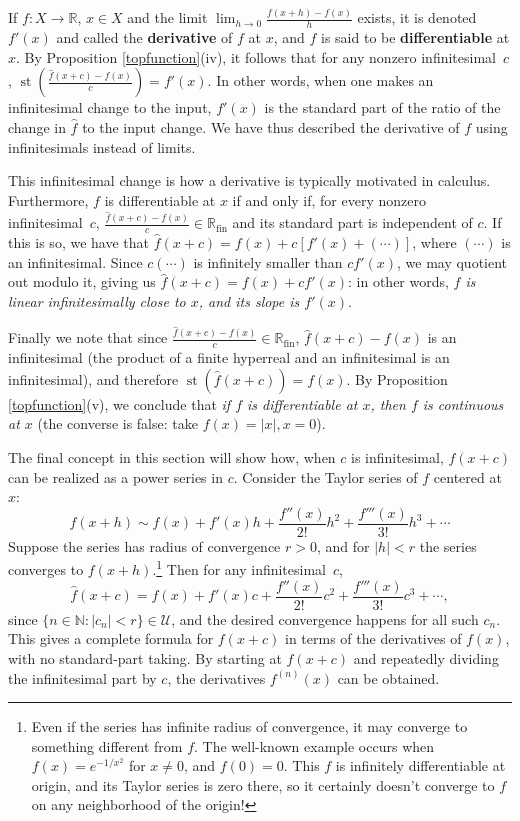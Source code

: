 \documentclass{article}
\def\U{\mathscr U}
\def\N{\mathbb N}
\def\R{\mathbb R}
\def\Rfin{\mathbb R_{\operatorname{fin}}}
\def\st{\operatorname{st}}
\begin{document}
If $f:X\to\R$, $x\in X$ and the limit $\lim_{h\to 0}\frac{f(x+h)-f(x)}h$ exists, it is denoted $f'(x)$ and called the \textbf{derivative} of $f$ at $x$, and $f$ is said to be \textbf{differentiable} at $x$.  By Proposition \ref{topfunction}(iv), it follows that for any nonzero infinitesimal~$c$, $\st\left(\frac{\widehat f(x+c)-f(x)}c\right)=f'(x)$.  In other words, when one makes an infinitesimal change to the input, $f'(x)$ is the standard part of the ratio of the change in $\widehat f$ to the input change.  We have thus described the derivative of $f$ using infinitesimals instead of limits.

This infinitesimal change is how a derivative is typically motivated in calculus.  Furthermore, $f$ is differentiable at $x$ if and only if, for every nonzero infinitesimal~$c$, $\frac{\widehat f(x+c)-f(x)}c\in\Rfin$ and its standard part is independent of $c$.  If this is so, we have that $\widehat f(x+c)=f(x)+c\left[f'(x)+(\cdots)\right]$, where $(\cdots)$ is an infinitesimal.  Since $c(\cdots)$ is infinitely smaller than $cf'(x)$, we may quotient out modulo it, giving us $\widehat f(x+c)=f(x)+cf'(x)$: in other words, \emph{$f$ is linear infinitesimally close to $x$, and its slope is $f'(x)$}.

Finally we note that since $\frac{\widehat f(x+c)-f(x)}c\in\Rfin$, $\widehat f(x+c)-f(x)$ is an infinitesimal (the product of a finite hyperreal and an infinitesimal is an infinitesimal), and therefore $\st(\widehat f(x+c))=f(x)$.  By Proposition \ref{topfunction}(v), we conclude that \emph{if $f$ is differentiable at $x$, then $f$ is continuous at $x$} (the converse is false: take $f(x)=|x|,x=0$).

The final concept in this section will show how, when $c$ is infinitesimal, $f(x+c)$ can be realized as a power series in $c$.  Consider the Taylor series of $f$ centered at $x$:
$$f(x+h)\sim f(x)+f'(x)h+\frac{f''(x)}{2!}h^2+\frac{f'''(x)}{3!}h^3+\cdots$$
Suppose the series has radius of convergence $r>0$, and for $|h|<r$ the series converges to $f(x+h)$.\footnote{Even if the series has infinite radius of convergence, it may converge to something different from $f$.  The well-known example occurs when $f(x)=e^{-1/x^2}$ for $x\ne 0$, and $f(0)=0$.  This $f$ is infinitely differentiable at origin, and its Taylor series is zero there, so it certainly doesn't converge to $f$ on any neighborhood of the origin!}  Then for any infinitesimal~$c$,
$$\widehat f(x+c)=f(x)+f'(x)c+\frac{f''(x)}{2!}c^2+\frac{f'''(x)}{3!}c^3+\cdots,$$
since $\{n\in\N:|c_n|<r\}\in\U$, and the desired convergence happens for all such $c_n$.  This gives a complete formula for $f(x+c)$ in terms of the derivatives of $f(x)$, with no standard-part taking.  By starting at $f(x+c)$ and repeatedly dividing the infinitesimal part by $c$, the derivatives $f^{(n)}(x)$ can be obtained.
\end{document}
